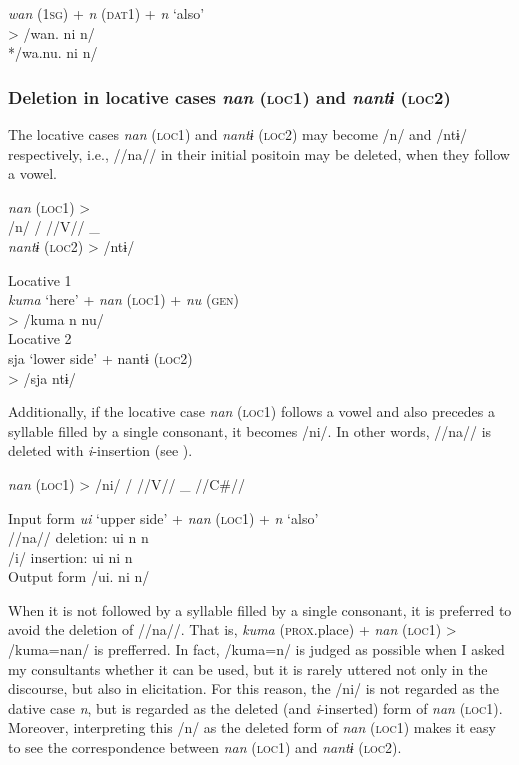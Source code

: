 \ea\label{ex:6-37}
    \textit{wan}  (1\textsc{sg})  +  \textit{n}  (\textsc{dat}1)  +  \textit{n}  ‘also’\\
  >  /wan.      ni      n/  \\
    */wa.nu.      ni      n/  
\z

\subsubsection{Deletion in locative cases \textit{nan} (\textsc{loc1}) and \textit{nantɨ} (\textsc{loc2})}

The locative cases \textit{nan} (\textsc{loc1}) and \textit{nantɨ} (\textsc{loc2}) may become /n/ and /ntɨ/ respectively, i.e., //na// in their initial positoin may be deleted, when they follow a vowel.

\ea\label{ex:6-38}
  \textit{nan}  (\textsc{loc1})  > \\ %
/n/    /  //V//  \_\\
  \textit{nantɨ}  (\textsc{loc2})  >  /ntɨ/
  \z

\ea\label{ex:6-39}
 \ea Locative 1      \\
    \textit{kuma}  ‘here’  +  \textit{nan}  (\textsc{loc1})  +  \textit{nu}  (\textsc{gen})\\
  >  /kuma      n      nu/  \\

\ex Locative 2      \\
    sja  ‘lower side’  +  nantɨ  (\textsc{loc2})\\
  >  /sja      ntɨ/        
  \z
  \z

Additionally, if the locative case \textit{nan} (\textsc{loc1}) follows a vowel and also precedes a syllable filled by a single consonant, it becomes /ni/. In other words, //na// is deleted with \textit{i}-insertion (see ).

\ea\label{ex:6-40}
  \textit{nan}  (\textsc{loc1})  >  /ni/  /  //V//  \_  //C\#//
\z

\ea\label{ex:6-41}
  Input form  \textit{ui}  ‘upper side’  +  \textit{nan}  (\textsc{loc1})  +  \textit{n}  ‘also’\\
  //na// deletion:  ui      n      n  \\
  /i/ insertion:  ui      ni      n  \\
  Output form  /ui.      ni      n/  
\z

When it is not followed by a syllable filled by a single consonant, it is preferred to avoid the deletion of //na//. That is, \textit{kuma} (\textsc{prox}.place) + \textit{nan} (\textsc{loc1}) > /kuma=nan/ is prefferred. In fact, /kuma=n/ is judged as possible when I asked my consultants whether it can be used, but it is rarely uttered not only in the discourse, but also in elicitation. For this reason, the /ni/ is not regarded as the dative case \textit{n}, but is regarded as the deleted (and \textit{i}-inserted) form of \textit{nan} (\textsc{loc1}). Moreover, interpreting this /n/ as the deleted form of \textit{nan} (\textsc{loc1}) makes it easy to see the correspondence between \textit{nan} (\textsc{loc1}) and \textit{nantɨ} (\textsc{loc2}).

